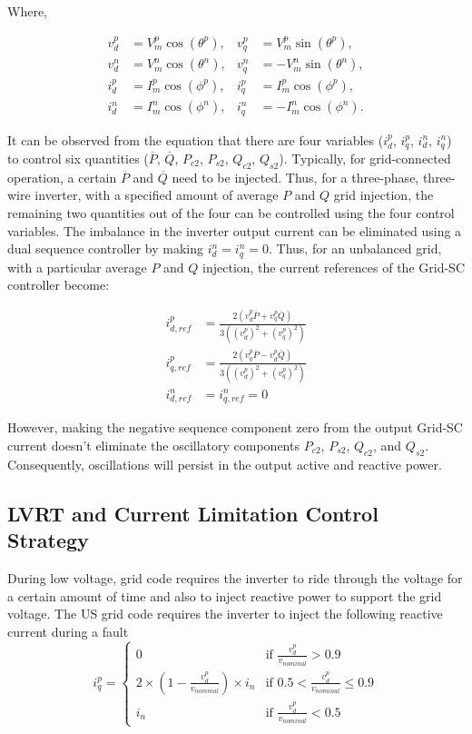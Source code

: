 \documentclass[conference]{IEEEtran}
\begin{document}
Where,

\begin{align*}
v_d^p &= V_m^p \cos(\theta^p), & v_q^p &= V_m^p \sin(\theta^p), \\
v_d^n &= V_m^n \cos(\theta^n), & v_q^n &= -V_m^n \sin(\theta^n), \\
i_d^p &= I_m^p \cos(\phi^p), & i_q^p &= I_m^p \cos(\phi^p), \\
i_d^n &= I_m^n \cos(\phi^n), & i_q^n &= -I_m^n \cos(\phi^n).
\end{align*}

It can be observed from the equation that there are four variables ($i_d^p$, $i_q^p$, $i_d^n$, $i_q^n$) to control six quantities ($\overline{P}$, $\overline{Q}$, $P_{c2}$, $P_{s2}$, $Q_{c2}$, $Q_{s2}$). Typically, for grid-connected operation, a certain $\overline{P}$ and $\overline{Q}$ need to be injected. Thus, for a three-phase, three-wire inverter, with a specified amount of average $P$ and $Q$ grid injection, the remaining two quantities out of the four can be controlled using the four control variables.
The imbalance in the inverter output current can be eliminated using a dual sequence controller by making $i_d^n = i_q^n = 0$. Thus, for an unbalanced grid, with a particular average $P$ and $Q$ injection, the current references of the Grid-SC controller become:

\begin{align}
i_{d,ref}^p &= \frac{2(v_d^p \overline{P} + v_q^p \overline{Q})}{3((v_d^p)^2 + (v_q^p)^2)} \\
i_{q,ref}^p &= \frac{2(v_q^p \overline{P} - v_d^p \overline{Q})}{3((v_d^p)^2 + (v_q^p)^2)} \\
i_{d,ref}^n &= i_{q,ref}^n = 0
\end{align}

However, making the negative sequence component zero from the output Grid-SC current doesn’t eliminate the oscillatory components $P_{c2}$, $P_{s2}$, $Q_{c2}$, and $Q_{s2}$. Consequently, oscillations will persist in the output active and reactive power.
\subsection{LVRT and Current Limitation Control Strategy}
During low voltage, grid code requires the inverter to ride through the voltage for a certain amount of time and also to inject reactive power to support the grid voltage. The US grid code requires the inverter to inject the following reactive current during a fault
\begin{equation}
i_{q}^{p} = \begin{cases} 0 & \text{if } \frac{v_d^p}{v_{nominal}} > 0.9 \\ 2 \times \left(1 - \frac{v_d^p}{v_{nominal}}\right) \times i_n & \text{if } 0.5 < \frac{v_d^p}{v_{nominal}} \leq 0.9 \\ i_n & \text{if } \frac{v_d^p}{v_{nominal}} < 0.5 \end{cases}
\end{equation}
\end{document}

